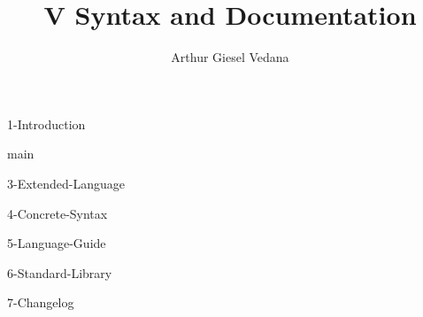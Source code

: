 \documentclass{article}
\author{Arthur Giesel Vedana}
\title{V Syntax and Documentation}
\begin{document}
\maketitle
\newpage

\tableofcontents
\newpage


{1-Introduction}
\newpage


{main}
\newpage

{3-Extended-Language}
\newpage

{4-Concrete-Syntax}
\newpage

{5-Language-Guide}
\newpage

{6-Standard-Library}
\newpage

{7-Changelog}
\newpage
\end{document}
